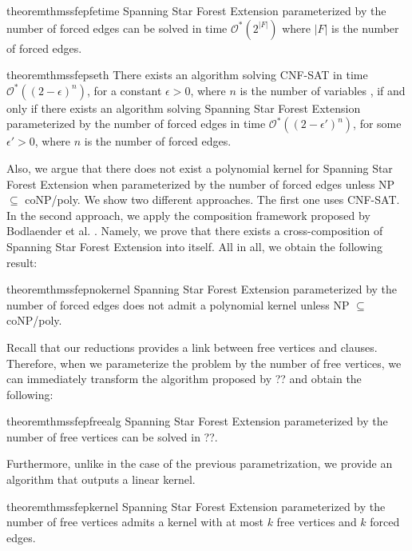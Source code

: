 \documentclass[en]{pracamgr}
\theoremstyle{definition}
\newcommand{\ssfep}{{\sc Spanning Star Forest Extension}}
\newcommand{\cnfsat}{{\sc CNF-SAT}}
\begin{document}
\begin{restatable}{theorem}{thmssfepfetime}\label{thm-ssfep-fe-time}
	\ssfep{} parameterized by the number of forced edges can be solved in time $\mathcal{O}^*(2^{|F|})$ where $|F|$ is the number of forced edges.
\end{restatable}

\begin{restatable}{theorem}{thmssfepseth}\label{thm-ssfep-seth}
	There exists an algorithm solving \cnfsat{} in time $\mathcal{O}^*((2-\epsilon)^n)$, for a constant $\epsilon > 0$, where $n$ is the number of variables , if and only if there exists an algorithm solving \ssfep{} parameterized by the number of forced edges in time $\mathcal{O}^*((2-\epsilon')
^n)$, for some $\epsilon'>0$, where $n$ is the number of forced edges.
\end{restatable}

\noindent
Also, we argue that there does not exist a polynomial kernel for \ssfep{} when parameterized by the number of forced edges unless NP $\subseteq$ coNP/poly. We show two different approaches. The first one uses \cnfsat{}. In the second approach, we apply the composition framework proposed by Bodlaender et al. \cite{Bodlaender}. Namely, we prove that there exists a cross-composition of \ssfep{} into itself. All in all, we obtain the following result:

\begin{restatable}{theorem}{thmssfepnokernel}\label{thm-ssfep-nokernel}
	\ssfep{} parameterized by the number of forced edges does not admit a polynomial kernel unless NP $\subseteq$ coNP/poly.
\end{restatable}

Recall that our reductions provides a link between free vertices and clauses. Therefore, when we parameterize the problem by the number of free vertices, we can immediately transform the algorithm proposed by ?? and obtain the following: %

\begin{restatable}{theorem}{thmssfepfreealg}\label{thm-ssfep-free-alg}
	\ssfep{} parameterized by the number of free vertices can be solved in ??.%
\end{restatable}

\noindent
Furthermore, unlike in the case of the previous parametrization, we provide an algorithm that outputs a linear kernel.

\begin{restatable}{theorem}{thmssfepkernel}\label{thm-ssfep-kernel}
	\ssfep{} parameterized by the number of free vertices admits a kernel with at most $k$ free vertices and $k$ forced edges.
\end{restatable}
\end{document}
